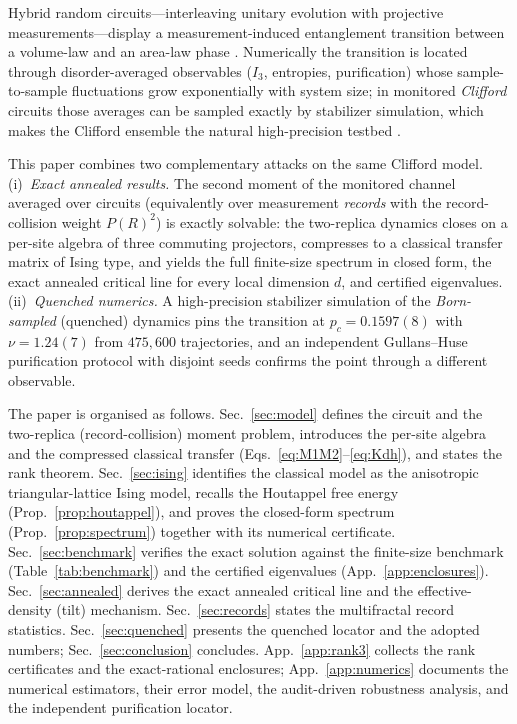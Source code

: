 \documentclass[11pt]{article}
\begin{document}
Hybrid random circuits---interleaving unitary evolution with projective
measurements---display a measurement-induced entanglement transition between
a volume-law and an area-law phase
\citep{Skinner2019,Li2018,Gullans2020,Nahum2020}.  Numerically the transition
is located through disorder-averaged observables ($I_3$, entropies,
purification) whose sample-to-sample fluctuations grow exponentially with
system size; in monitored \emph{Clifford} circuits those averages can be
sampled exactly by stabilizer simulation, which makes the Clifford ensemble
the natural high-precision testbed \citep{Gullans2020,Sierant2022,Zabalo2020}.

This paper combines two complementary attacks on the same Clifford model.
(i)~\emph{Exact annealed results.}  The second moment of the monitored
channel averaged over circuits (equivalently over measurement \emph{records}
with the record-collision weight $P(R)^2$) is exactly solvable: the
two-replica dynamics closes on a per-site algebra of three commuting
projectors, compresses to a classical transfer matrix of Ising type, and
yields the full finite-size spectrum in closed form, the exact annealed
critical line for every local dimension $d$, and certified eigenvalues.
(ii)~\emph{Quenched numerics.}  A high-precision stabilizer simulation of the
\emph{Born-sampled} (quenched) dynamics pins the transition at
$p_c=0.1597(8)$ with $\nu=1.24(7)$ from $475{,}600$ trajectories, and an
independent Gullans--Huse purification protocol with disjoint seeds confirms
the point through a different observable.

The paper is organised as follows.  Sec.~\ref{sec:model} defines the circuit
and the two-replica (record-collision) moment problem, introduces the
per-site algebra and the compressed classical transfer
(Eqs.~\ref{eq:M1M2}--\ref{eq:Kdh}), and states the rank theorem.
Sec.~\ref{sec:ising} identifies the classical model as the anisotropic
triangular-lattice Ising model, recalls the Houtappel free energy
(Prop.~\ref{prop:houtappel}), and proves the closed-form spectrum
(Prop.~\ref{prop:spectrum}) together with its numerical certificate.
Sec.~\ref{sec:benchmark} verifies the exact solution against the
finite-size benchmark (Table~\ref{tab:benchmark}) and the certified
eigenvalues (App.~\ref{app:enclosures}).  Sec.~\ref{sec:annealed} derives the
exact annealed critical line and the effective-density (tilt) mechanism.
Sec.~\ref{sec:records} states the multifractal record statistics.
Sec.~\ref{sec:quenched} presents the quenched locator and the adopted
numbers; Sec.~\ref{sec:conclusion} concludes.  App.~\ref{app:rank3} collects
the rank certificates and the exact-rational enclosures; App.~\ref{app:numerics}
documents the numerical estimators, their error model, the audit-driven
robustness analysis, and the independent purification locator.
\end{document}
